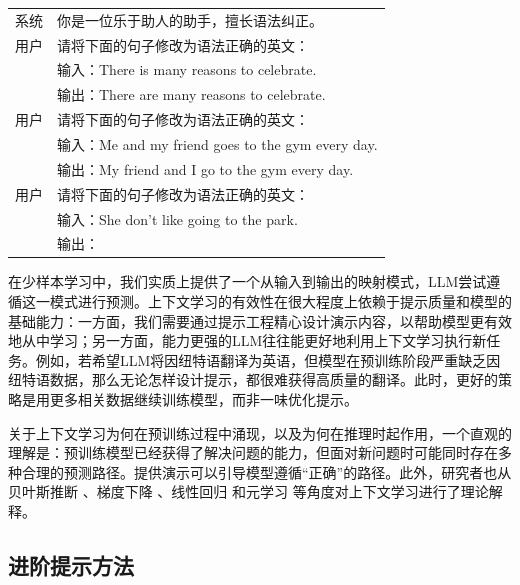 \vspace{0.5em}
\begin{tcolorbox}

\begingroup
\renewcommand{\arraystretch}{1.0}
\setlength{\tabcolsep}{6pt}
\begin{tabular}{r l}
{\color{gray} \footnotesize{系统}} & 你是一位乐于助人的助手，擅长语法纠正。 \\ [0.2cm]
{\color{gray} \footnotesize{用户}}  & 请将下面的句子修改为语法正确的英文： \\ [0.1cm]
 & 输入：There is many reasons to celebrate. \\
 & 输出：There are many reasons to celebrate. \\ [0.2cm]
{\color{gray} \footnotesize{用户}}  & 请将下面的句子修改为语法正确的英文： \\ [0.1cm]
 & 输入：Me and my friend goes to the gym every day. \\
 & 输出：My friend and I go to the gym every day. \\ [0.2cm]
{\color{gray} \footnotesize{用户}}  & 请将下面的句子修改为语法正确的英文： \\ [0.1cm]
 & 输入：She don't like going to the park. \\
 & 输出：\underline{\hspace{2em}}
\end{tabular}
\endgroup

\end{tcolorbox}
\vspace{0.5em}

在少样本学习中，我们实质上提供了一个从输入到输出的映射模式，LLM尝试遵循这一模式进行预测。上下文学习的有效性在很大程度上依赖于提示质量和模型的基础能力：一方面，我们需要通过提示工程精心设计演示内容，以帮助模型更有效地从中学习；另一方面，能力更强的LLM往往能更好地利用上下文学习执行新任务。例如，若希望LLM将因纽特语翻译为英语，但模型在预训练阶段严重缺乏因纽特语数据，那么无论怎样设计提示，都很难获得高质量的翻译。此时，更好的策略是用更多相关数据继续训练模型，而非一味优化提示。

关于上下文学习为何在预训练过程中涌现，以及为何在推理时起作用，一个直观的理解是：预训练模型已经获得了解决问题的能力，但面对新问题时可能同时存在多种合理的预测路径。提供演示可以引导模型遵循“正确”的路径。此外，研究者也从贝叶斯推断 \cite{xie-etal:2022an}、梯度下降 \cite{dai-etal:2023can,von-etal:2023transformers}、线性回归 \cite{akyurek-etal:2023what} 和元学习 \cite{garg-etal:2022can} 等角度对上下文学习进行了理论解释。

\subsection{进阶提示方法}
\label{sec:advanced-prompting}


